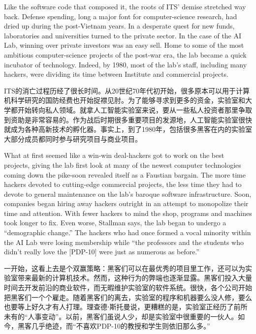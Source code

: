 \ifdefined\eng
Like the software code that composed it, the roots of ITS' demise stretched way back. Defense spending, long a major font for computer-science research, had dried up during the post-Vietnam years. In a desperate quest for new funds, laboratories and universities turned to the private sector. In the case of the AI Lab, winning over private investors was an easy sell. Home to some of the most ambitious computer-science projects of the post-war era, the lab became a quick incubator of technology. Indeed, by 1980, most of the lab's staff, including many hackers, were dividing its time between Institute and commercial projects.
\fi

\ifdefined\chs
ITS的消亡过程历经了很长时间。从20世纪70年代初开始，很多原本可以用于计算机科学研究的国防经费也开始捉襟见肘。为了能够寻求到更多的资金，实验室和大学都开始转向私人领域。就拿人工智能实验室来说，要从一些私人投资者那里争取到资助是非常容易的。作为战后时期很多重要项目的发源地，人工智能实验室很快就成为各种高新技术的孵化器。事实上，到了1980年，包括很多黑客在内的实验室大部分成员都同时参与研究项目与商业项目。
\fi

\ifdefined\eng
What at first seemed like a win-win deal-hackers got to work on the best projects, giving the lab first look at many of the newest computer technologies coming down the pike-soon revealed itself as a Faustian bargain. The more time hackers devoted to cutting-edge commercial projects, the less time they had to devote to general maintenance on the lab's baroque software infrastructure. Soon, companies began hiring away hackers outright in an attempt to monopolize their time and attention. With fewer hackers to mind the shop, programs and machines took longer to fix. Even worse, Stallman says, the lab began to undergo a ``demographic change.'' The hackers who had once formed a vocal minority within the AI Lab were losing membership while ``the professors and the students who didn't really love the [PDP-10] were just as numerous as before.''
\fi

\ifdefined\chs
一开始，这看上去是个双赢策略：黑客们可以在最优秀的项目里工作，还可以为实验室带来最新的计算机技术。然而，这种行为的弊端也逐渐显露。黑客们投入大量时间去开发前沿的商业软件，而无暇维护实验室的软件系统。很快，各个公司开始把黑客们一个个雇走。随着黑客们的离去，实验室的程序和机器要么没人修，要么也要等上好久才有人打理。理查德⋅斯托曼说，更糟糕的是，实验室正经历了前所未有的``人事变动''。以前，黑客们虽说人少，却是实验室中很重要的一伙人。如今，黑客几乎绝迹，而``不喜欢PDP-10的教授和学生则依旧那么多。''
\fi

